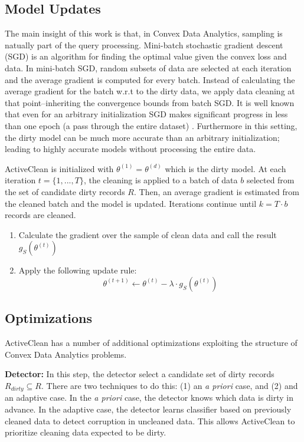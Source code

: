 \subsection{Model Updates}
The main insight of this work is that, in Convex Data Analytics, sampling is natually part of the query processing.
Mini-batch stochastic gradient descent (SGD) is an algorithm for finding the optimal value
given the convex loss and data.
In mini-batch SGD, random subsets of data are selected at each iteration and the average gradient is computed for every batch.
Instead of calculating the average gradient for the batch w.r.t to the dirty data, we apply data cleaning at that point--inheriting the convergence bounds from batch SGD.
It is well known that even for an arbitrary initialization SGD makes significant progress in less than one epoch (a pass through the entire dataset) \cite{bottou2012stochastic}.
Furthermore in this setting, the dirty model can be much more accurate than an arbitrary initialization; leading to highly accurate models without processing the entire data.

ActiveClean is initialized with $\theta^{(1)} = \theta^{(d)}$ which is the dirty model.
At each iteration $t=\{1,...,T\}$, the cleaning is applied to a batch of data $b$ selected from the set of candidate dirty records $R$.
Then, an average gradient is estimated from the cleaned batch and the model is updated.
Iterations continue until $k = T \cdot b$ records are cleaned.

\begin{enumerate}[noitemsep]
	\item Calculate the gradient over the sample of clean data and call the result $g_S(\theta^{(t)})$
	\item Apply the following update rule:
	\[
	\theta^{(t+1)} \leftarrow \theta^{(t)} - \lambda \cdot g_S(\theta^{(t)}) 
	\]
\end{enumerate} 

\subsection{Optimizations}
ActiveClean has a number of additional optimizations exploiting the structure of Convex Data Analytics problems.

\noindent\textbf{Detector: } In this step, the detector select a candidate set of dirty records $R_{dirty} \subseteq R$. There are two techniques to do this: (1) an \emph{a priori} case, and (2) and an adaptive case. In the \emph{a priori} case, the detector knows which data is dirty in advance. In the adaptive case, the detector learns classifier based on previously cleaned data to detect corruption in uncleaned data. This allows ActiveClean to prioritize cleaning data expected to be dirty. 


